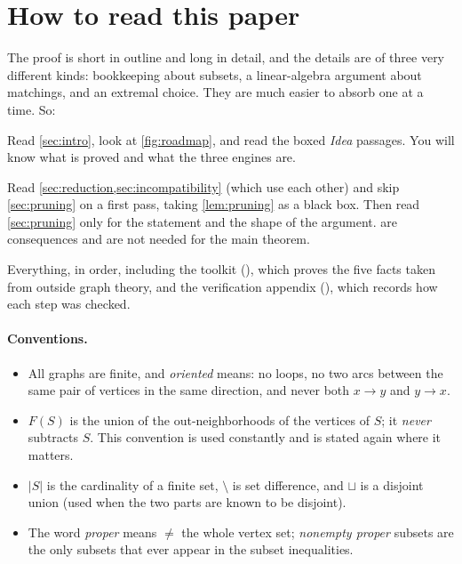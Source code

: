 \section*{How to read this paper}

The proof is short in outline and long in detail, and the details are of three very different
kinds: bookkeeping about subsets, a linear-algebra argument about matchings, and an extremal
choice. They are much easier to absorb one at a time. So:

\begin{description}[leftmargin=1.2em,itemsep=2pt]
\item[Level 1 --- five minutes.] Read \cref{sec:intro}, look at \cref{fig:roadmap}, and read the
  boxed \emph{Idea} passages. You will know what is proved and what the three engines are.
\item[Level 2 --- an hour.] Read \cref{sec:reduction,sec:incompatibility} (which use each other)
  and skip \cref{sec:pruning} on a first pass, taking \cref{lem:pruning} as a black box. Then read
  \cref{sec:pruning} only for the statement and the shape of the argument. 
  are consequences and are not needed for the main theorem.
\item[Level 3 --- a day.] Everything, in order, including the toolkit (), which
  proves the five facts taken from outside graph theory, and the verification appendix
  (), which records how each step was checked.
\end{description}

\paragraph{Conventions.}
\begin{itemize}[leftmargin=1.2em,itemsep=1pt]
\item All graphs are finite, and \emph{oriented} means: no loops, no two arcs between the same
  pair of vertices in the same direction, and never both $x\to y$ and $y\to x$.
\item $F(S)$ is the union of the out-neighborhoods of the vertices of $S$; it \emph{never}
  subtracts $S$. This convention is used constantly and is stated again where it matters.
\item $|S|$ is the cardinality of a finite set, $\setminus$ is set difference, and $\sqcup$ is a
  disjoint union (used when the two parts are known to be disjoint).
\item The word \emph{proper} means $\neq$ the whole vertex set; \emph{nonempty proper} subsets are
  the only subsets that ever appear in the subset inequalities.
\end{itemize}

